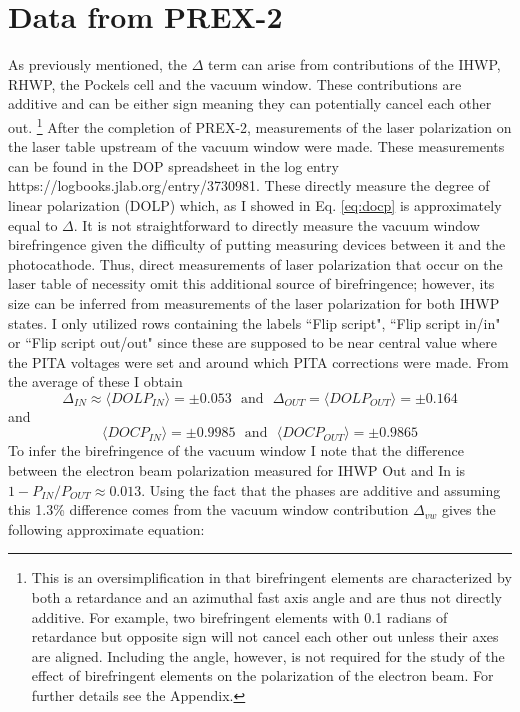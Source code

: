 \documentclass[12pt]{article}
\begin{document}
\section{Data from PREX-2}
As previously mentioned, the $\Delta$ term can arise from contributions of the IHWP, RHWP, the Pockels cell and the vacuum window. These contributions are additive and can be either sign meaning they can potentially cancel each other out. \footnote{This is an oversimplification in that birefringent elements are characterized by both a retardance and an azimuthal fast axis angle and are thus not directly additive. For example, two birefringent elements with 0.1 radians of retardance but opposite sign will not cancel each other out unless their axes are aligned. Including the angle, however, is not required for the study of the effect of birefringent elements on the polarization of the electron beam. For further details see the Appendix.} After the completion of PREX-2, measurements of the laser polarization on the laser table upstream of the vacuum window were made. These measurements can be found in the DOP spreadsheet in the log entry  https://logbooks.jlab.org/entry/3730981. These directly measure the degree of linear polarization (DOLP) which, as I showed in Eq. \ref{eq:docp} is approximately equal to $\Delta$. It is not straightforward to directly measure the vacuum window birefringence given the difficulty of putting measuring devices between it and the photocathode. Thus, direct measurements of laser polarization that occur on the laser table of necessity omit this additional source of birefringence; however, its size can be inferred from measurements of the laser polarization for both IHWP states. I only utilized rows containing the labels ``Flip script", ``Flip script in/in" or ``Flip script out/out" since these are supposed to be near central value where the PITA voltages were set and around which PITA corrections were made. From the average of these I obtain
\begin{equation}
\Delta_{IN}\approx\langle DOLP_{IN} \rangle=\pm0.053 ~~~ \textrm{and}~~~ \Delta_{OUT}=\langle DOLP_{OUT} \rangle=\pm0.164
\label{eq:docp_in}
\end{equation}
and 
\begin{equation}
\label{eq:docp_out}
\langle DOCP_{IN} \rangle=\pm0.9985 ~~~ \textrm{and}~~~ \langle DOCP_{OUT} \rangle=\pm0.9865
\end{equation}
To infer the birefringence of the vacuum window I note that the difference between the electron beam polarization measured for IHWP Out and In is $1-P_{IN}/P_{OUT}\approx 0.013.$ Using the fact that the phases are additive and assuming this 1.3\% difference comes from the vacuum window contribution $\Delta_{vw}$ gives the following approximate equation:
\end{document}
